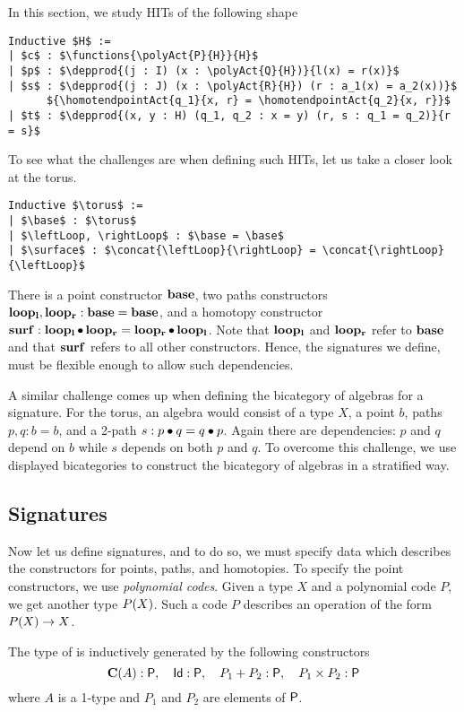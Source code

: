 In this section, we study HITs of the following shape
\begin{lstlisting}[mathescape=true]
Inductive $H$ :=
| $c$ : $\functions{\polyAct{P}{H}}{H}$
| $p$ : $\depprod{(j : I) (x : \polyAct{Q}{H})}{l(x) = r(x)}$
| $s$ : $\depprod{(j : J) (x : \polyAct{R}{H}) (r : a_1(x) = a_2(x))}$
      ${\homotendpointAct{q_1}{x, r} = \homotendpointAct{q_2}{x, r}}$
| $t$ : $\depprod{(x, y : H) (q_1, q_2 : x = y) (r, s : q_1 = q_2)}{r = s}$
\end{lstlisting}
To see what the challenges are when defining such HITs, let us take a closer look at the torus.

\begin{lstlisting}[mathescape=true]
Inductive $\torus$ :=
| $\base$ : $\torus$
| $\leftLoop, \rightLoop$ : $\base = \base$
| $\surface$ : $\concat{\leftLoop}{\rightLoop} = \concat{\rightLoop}{\leftLoop}$
\end{lstlisting}

There is a point constructor $\operatorname{\mathbf{base}}$, two paths constructors $\operatorname{\mathbf{loop_l}}, \operatorname{\mathbf{loop_r}} : \operatorname{\mathbf{base}} = \operatorname{\mathbf{base}}$,
and a homotopy constructor $\operatorname{\mathbf{surf}} : \operatorname{\mathbf{loop_l}} \bullet \operatorname{\mathbf{loop_r}} = \operatorname{\mathbf{loop_r}} \bullet \operatorname{\mathbf{loop_l}}$.
Note that $\operatorname{\mathbf{loop_l}}$ and $\operatorname{\mathbf{loop_r}}$ refer to $\operatorname{\mathbf{base}}$ and that $\operatorname{\mathbf{surf}}$ refers to all other constructors.
Hence, the signatures we define, must be flexible enough to allow such dependencies.

A similar challenge comes up when defining the bicategory of algebras for a signature.
For the torus, an algebra would consist of a type $X$, a point $b$, paths $p, q : b = b$, and a 2-path $s : p \bullet q = q \bullet p$.
Again there are dependencies: $p$ and $q$ depend on $b$ while $s$ depends on both $p$ and $q$.
To overcome this challenge, we use displayed bicategories to construct the bicategory of algebras in a stratified way.

\subsection{Signatures}\label{sec:signatures}
Now let us define signatures, and to do so, we must specify data which describes the constructors for points, paths, and homotopies.
To specify the point constructors, we use \emph{polynomial codes}.
Given a type $X$ and a polynomial code $P$, we get another type $P(X)$.
Such a code $P$ describes an operation of the form $P(X) \rightarrow X$.

\begin{definition}
The type of  is inductively generated by the following constructors
\[ 
\operatorname{\mathbf{C}}(A) : \mathsf{P}, \quad \mathsf{Id} : \mathsf{P}, \quad P_1 + P_2 : \mathsf{P}, \quad P_1 \times P_2 : \mathsf{P}
\]
where $A$ is a 1-type and $P_1$ and $P_2$ are elements of $\mathsf{P}$.
\end{definition}

